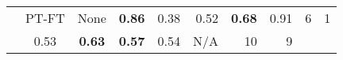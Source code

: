 \begin{table}[t]
{\begin{tabular}{|>{\columncolor{gray10}}c|c|c|rrrrrrr|}
        \multirow{-14}{*}{\textbf{\textit{Integrated}}} & \multirow{-4}{*}{PT-FT} & None & \cellcolor{yellow!60}\textbf{0.86} & \cellcolor{yellow!60}0.38 & \cellcolor{yellow!60}0.52 & \cellcolor{yellow!60}\textbf{0.68} & \cellcolor{yellow!60}0.91 & \cellcolor{yellow!60}6 & \cellcolor{yellow!60}1 \\ \hhline{~|--|-------|}
        \Xhline{1\arrayrulewidth}
        \multicolumn{3}{|c|}{\cellcolor{gray10}\textbf{\fixCommits}} & 0.53 & \textbf{0.63} & \textbf{0.57} & 0.54 & N/A & 10 & 9 \\ \hline
        \end{tabular}%
    }
\end{table}